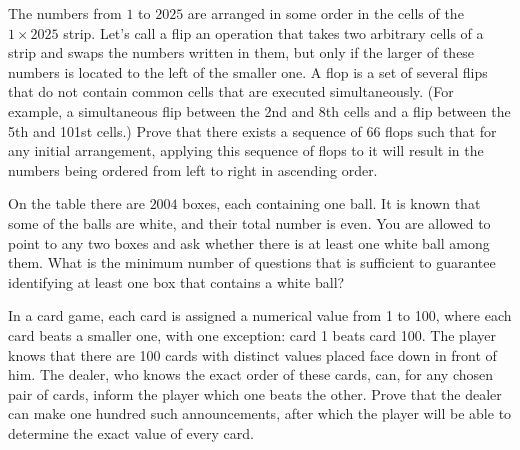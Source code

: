 \begin{problem} [239 olympiad 2025]
    The numbers from $1$ to $2025$ are arranged in some order in the cells of the $1 \times 2025$ strip. Let's call a flip an operation that takes two arbitrary cells of a strip and swaps the numbers written in them, but only if the larger of these numbers is located to the left of the smaller one. A flop is a set of several flips that do not contain common cells that are executed simultaneously. (For example, a simultaneous flip between the 2nd and 8th cells and a flip between the 5th and 101st cells.) Prove that there exists a sequence of $66$ flops such that for any initial arrangement, applying this sequence of flops to it will result in the numbers being ordered from left to right in ascending order.
\end{problem}

\begin{problem} [Russia 2004]
On the table there are $2004$ boxes, each containing one ball. It is known that some of the balls are white, and their total number is even. You are allowed to point to any two boxes and ask whether there is at least one white ball among them. What is the minimum number of questions that is sufficient to guarantee identifying at least one box that contains a white ball?
\end{problem}

\begin{problem}[Russia 2018]
In a card game, each card is assigned a numerical value from 1 to 100, 
where each card beats a smaller one, with one exception: card 1 beats card 100. The player knows that there are 100 cards with distinct values placed face down in front of him. The dealer, who knows the exact order of these cards, can, for any chosen pair of cards, inform the player which one beats the other. 
Prove that the dealer can make one hundred such announcements, after which 
the player will be able to determine the exact value of every card.
\end{problem}
